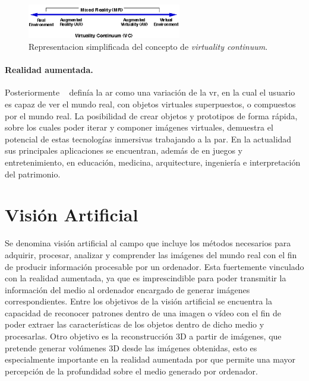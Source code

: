 \begin{figure}
  \centering
  \includegraphics[width=0.6\textwidth]{imaxes/virtuality_continuum.png}
  \caption{Representacion simplificada del concepto de \emph{virtuality continuum}.}
  \label{fig:vc}
\end{figure}

\paragraph{Realidad aumentada.}
Posteriormente \citeauthor{Azuma1997}~\cite{Azuma1997} definía la \acrlong{ar} como una variación de la \acrlong{vr}, en la cual el usuario es capaz de ver el mundo real, con objetos virtuales superpuestos, o compuestos por el mundo real. La posibilidad de crear objetos y prototipos de forma rápida, sobre los cuales poder iterar y componer imágenes virtuales, demuestra el potencial de estas tecnologías inmersivas trabajando a la par. En la actualidad sus principales aplicaciones se encuentran, además de en juegos y entretenimiento, en educación, medicina, arquitecture, ingeniería e interpretación del patrimonio.


\section{Visión Artificial}

Se denomina visión artificial al campo que incluye los métodos necesarios para adquirir, procesar, analizar y comprender las imágenes del mundo real con el fin de producir información procesable por un ordenador. Esta fuertemente vinculado con la realidad aumentada, ya que es imprescindible para poder transmitir la información del medio al ordenador encargado de generar imágenes correspondientes. 
Entre los objetivos de la visión artificial se encuentra la capacidad de reconocer patrones dentro de una imagen o vídeo con el fin de poder extraer las características de los objetos dentro de dicho medio y  procesarlas. 
Otro objetivo es la reconstrucción 3D a partir de imágenes, que pretende generar volúmenes 3D desde las imágenes obtenidas, esto es especialmente importante en la realidad aumentada por que permite una mayor percepción de la profundidad sobre el medio generado por ordenador.